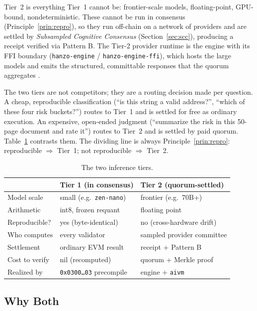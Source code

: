 Tier~2 is everything Tier~1 cannot be: frontier-scale models, floating-point, GPU-bound, nondeterministic. These cannot be run in consensus (Principle~\ref{prin:repro}), so they run off-chain on a network of providers and are settled by \emph{Subsampled Cognitive Consensus} (Section~\ref{sec:scc}), producing a \PoT{} receipt verified via Pattern B. The Tier-2 provider runtime is the \Hanzo{} engine with its FFI boundary (\texttt{hanzo-engine} / \texttt{hanzo-engine-ffi}), which hosts the large models and emits the structured, committable responses that the quorum aggregates \cite{hanzo-engine}.

The two tiers are not competitors; they are a routing decision made per question. A cheap, reproducible classification (``is this string a valid address?'', ``which of these four risk buckets?'') routes to Tier~1 and is settled for free as ordinary execution. An expensive, open-ended judgment (``summarize the risk in this 50-page document and rate it'') routes to Tier~2 and is settled by paid quorum. Table~\ref{tab:tiers} contrasts them. The dividing line is always Principle~\ref{prin:repro}: reproducible $\Rightarrow$ Tier~1; not reproducible $\Rightarrow$ Tier~2.

\begin{table}[h]
\centering
\caption{The two inference tiers.}
\label{tab:tiers}
\small
\begin{tabular}{@{}lll@{}}
\toprule
 & Tier 1 (in consensus) & Tier 2 (quorum-settled) \\
\midrule
Model scale & small (e.g.\ \texttt{zen-nano}) & frontier (e.g.\ 70B+) \\
Arithmetic & int8, frozen requant & floating point \\
Reproducible? & yes (byte-identical) & no (cross-hardware drift) \\
Who computes & every validator & sampled provider committee \\
Settlement & ordinary EVM result & \PoT{} receipt + Pattern B \\
Cost to verify & nil (recomputed) & quorum + Merkle proof \\
Realized by & \texttt{0x0300\dots03} precompile & \Hanzo{} engine + \texttt{aivm} \\
\bottomrule
\end{tabular}
\end{table}

\subsection{Why Both}


